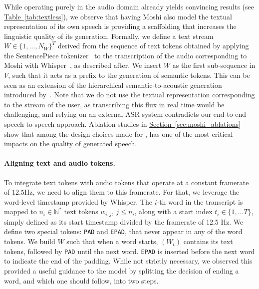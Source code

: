 \subsubsection{\interleaving}
\label{sec:interleaving}

While operating purely in the audio domain already yields convincing results (see \hyperref[tab:textless]{Table~\ref{tab:textless}}), we observe
that having Moshi also model the textual representation of its own speech is providing a 
scaffolding that increases the linguistic quality of its generation. Formally, we define a text stream $W \in \{1, \ldots, N_W\}^T$ derived from the sequence of text tokens obtained by applying the SentencePiece tokenizer~\citep{kudo2018sentencepiece} to the transcription of the audio corresponding to Moshi with Whisper~\citep{whisper}, as described after. We insert $W$ as the first sub-sequence in $V$, such that it acts as a prefix to the generation of semantic tokens. This can be seen as an extension of the hierarchical semantic-to-acoustic generation introduced by~\citet{audiolm}. Note that we do not use the textual representation corresponding to the stream of the user, as transcribing this flux in real time would be challenging, and relying on an external ASR system contradicts our end-to-end speech-to-speech approach. Ablation studies in \hyperref[sec:moshi_ablations]{Section~\ref{sec:moshi_ablations}} show that among the design choices made for \ours{}, \interleaving{} has one of the most critical impacts on the quality of generated speech.

\paragraph{Aligning text and audio tokens.}

To integrate text tokens with audio tokens that operate at a constant framerate of 12.5Hz, we need to align them to this framerate. For that, we leverage the word-level timestamp provided by Whisper. 
The $i$-th word in the transcript is mapped to $n_i \in \mathbb{N}^*$ text tokens $w_{i, j}$, $j \leq n_i$, along with a start index $t_i \in \{1, \ldots T\}$, simply defined
as its start timestamp divided by the framerate of 12.5 Hz.
We define two special tokens: \texttt{PAD} and \texttt{EPAD}, that
never appear in any of the word tokens. We build $W$ such that when a word starts,
$(W_t)$ contains its text tokens, followed by \texttt{PAD} until the next word. \texttt{EPAD} is inserted before the next word to indicate the end of the padding. While
not strictly necessary, we observed this provided a useful guidance to the model by splitting the decision of ending a word, and which one should follow, into two steps.


